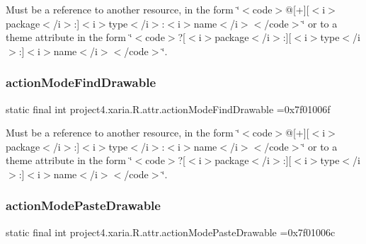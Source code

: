 Must be a reference to another resource, in the form \char`\"{}$<$code$>$@\mbox{[}+\mbox{]}\mbox{[}$<$i$>$package$<$/i$>$\+:\mbox{]}$<$i$>$type$<$/i$>$\+:$<$i$>$name$<$/i$>$$<$/code$>$\char`\"{} or to a theme attribute in the form \char`\"{}$<$code$>$?\mbox{[}$<$i$>$package$<$/i$>$\+:\mbox{]}\mbox{[}$<$i$>$type$<$/i$>$\+:\mbox{]}$<$i$>$name$<$/i$>$$<$/code$>$\char`\"{}. \mbox{\label{classproject4_1_1xaria_1_1R_1_1attr_a6db1f9424a3ef67b80ce5f1c1bb8e046}} 
\subsubsection{\texorpdfstring{action\+Mode\+Find\+Drawable}{actionModeFindDrawable}}
{\footnotesize\ttfamily static final int project4.\+xaria.\+R.\+attr.\+action\+Mode\+Find\+Drawable =0x7f01006f\hspace{0.3cm}{\ttfamily [static]}}

Must be a reference to another resource, in the form \char`\"{}$<$code$>$@\mbox{[}+\mbox{]}\mbox{[}$<$i$>$package$<$/i$>$\+:\mbox{]}$<$i$>$type$<$/i$>$\+:$<$i$>$name$<$/i$>$$<$/code$>$\char`\"{} or to a theme attribute in the form \char`\"{}$<$code$>$?\mbox{[}$<$i$>$package$<$/i$>$\+:\mbox{]}\mbox{[}$<$i$>$type$<$/i$>$\+:\mbox{]}$<$i$>$name$<$/i$>$$<$/code$>$\char`\"{}. \mbox{\label{classproject4_1_1xaria_1_1R_1_1attr_a1010ffe659185937b5a32a04a4c51a7c}} 
\subsubsection{\texorpdfstring{action\+Mode\+Paste\+Drawable}{actionModePasteDrawable}}
{\footnotesize\ttfamily static final int project4.\+xaria.\+R.\+attr.\+action\+Mode\+Paste\+Drawable =0x7f01006c\hspace{0.3cm}{\ttfamily [static]}}

